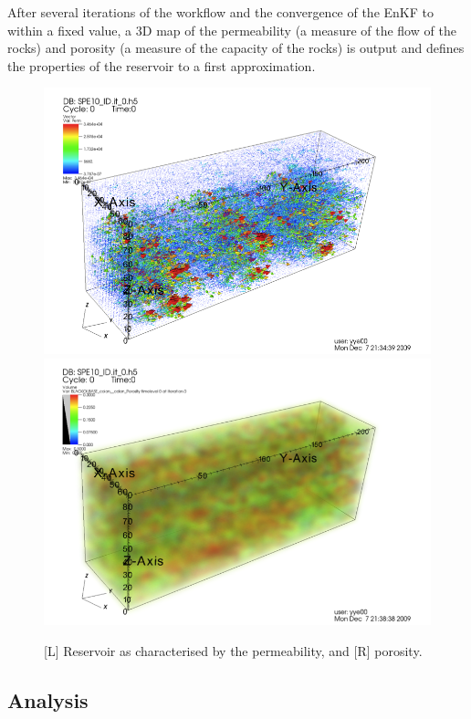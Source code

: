 \documentclass{acm_proc_article-sp}
\begin{document}
After several iterations of the workflow and the convergence of the
EnKF to within a fixed value, a 3D map of the permeability (a measure of the flow
of the rocks) and porosity (a measure of the capacity of the rocks) is 
output and defines the properties of the reservoir to a first
approximation. \begin{figure}
\begin{center}
\includegraphics[scale=0.45]{figures/permeability.png}
\includegraphics[scale=0.45]{figures/porosity.png}
\end{center}
\caption[Simulation Output]{[L] Reservoir as characterised by the
  permeability, and [R] porosity. }
\label{}
\end{figure}

\subsection{Analysis} 
\end{document}
